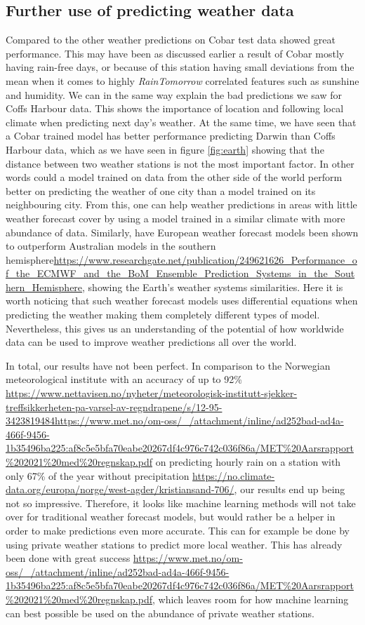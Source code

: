 \documentclass[11pt]{article}
\begin{document}
\subsection{Further use of predicting weather data}
Compared to the other weather predictions on Cobar test data showed great performance. This may have been as discussed earlier a result of Cobar mostly having rain-free days, or because of this station having small deviations from the mean when it comes to highly \textit{RainTomorrow} correlated features such as sunshine and humidity. We can in the same way explain the bad predictions we saw for Coffs Harbour data. This shows the importance of location and following local climate when predicting next day's weather.
At the same time, we have seen that a Cobar trained model has better performance predicting Darwin than Coffs Harbour data, which as we have seen in figure \ref{fig:earth} showing that the distance between two weather stations is not the most important factor. In other words could a model trained on data from the other side of the world perform better on predicting the weather of one city than a model trained on its neighbouring city. From this, one can help weather predictions in areas with little weather forecast cover by using a model trained in a similar climate with more abundance of data. Similarly, have European weather forecast models been shown to outperform Australian models in the southern hemisphere\url{https://www.researchgate.net/publication/249621626_Performance_of_the_ECMWF_and_the_BoM_Ensemble_Prediction_Systems_in_the_Southern_Hemisphere}, showing the Earth's weather systems similarities. Here it is worth noticing that such weather forecast models uses differential equations when predicting the weather making them completely different types of model. Nevertheless, this gives us an understanding of the potential of how worldwide data can be used to improve weather predictions all over the world.

In total, our results have not been perfect. In comparison to the Norwegian meteorological institute with an accuracy of up to 92\% \url{https://www.nettavisen.no/nyheter/meteorologisk-institutt-sjekker-treffsikkerheten-pa-varsel-av-regndrapene/s/12-95-3423819484}\url{https://www.met.no/om-oss/_/attachment/inline/ad252bad-ad4a-466f-9456-1b35496ba225:af8c5e5bfa70eabe20267df4c976c742c036f86a/MET%20Aarsrapport%202021%20med%20regnskap.pdf} on predicting hourly rain on a station with only 67\% of the year without precipitation \url{https://no.climate-data.org/europa/norge/west-agder/kristiansand-706/}, our results end up being not so impressive. Therefore, it looks like machine learning methods will not take over for traditional weather forecast models, but would rather be a helper in order to make predictions even more accurate. This can for example be done by using private weather stations to predict more local weather. This has already been done with great success \url{https://www.met.no/om-oss/_/attachment/inline/ad252bad-ad4a-466f-9456-1b35496ba225:af8c5e5bfa70eabe20267df4c976c742c036f86a/MET%20Aarsrapport%202021%20med%20regnskap.pdf}, which leaves room for how  machine learning can best possible be used on the abundance of private weather stations. 
\end{document}
